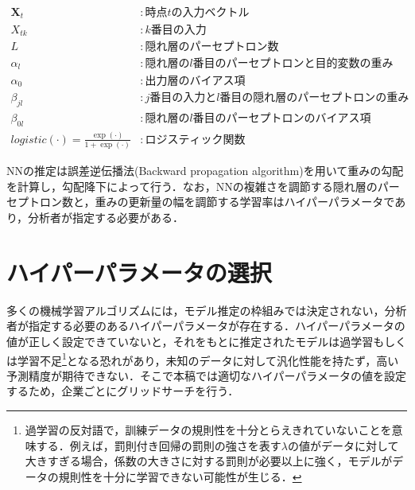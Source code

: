 \documentclass[a4paper，12pt]{jsarticle}
\begin{document}
\begin{equation}
  \begin{split}
    \bm{X}_t &: 時点tの入力ベクトル \\
    X_{tk} &: k番目の入力 \\
    L &: 隠れ層のパーセプトロン数 \\
    \alpha_l &: 隠れ層のl番目のパーセプトロンと目的変数の重み \\
    \alpha_0 &: 出力層のバイアス項 \\
    \beta_{jl} &: j番目の入力とl番目の隠れ層のパーセプトロンの重み \\
    \beta_{0l} &: 隠れ層のl番目のパーセプトロンのバイアス項 \\
    \textit{logistic}(\cdot) = \frac{\exp(\cdot)}{1 + \exp(\cdot)} &: ロジスティック関数
  \end{split}
\end{equation}

NNの推定は誤差逆伝播法(Backward propagation algorithm)を用いて重みの勾配を計算し，勾配降下によって行う．なお，NNの複雑さを調節する隠れ層のパーセプトロン数と，重みの更新量の幅を調節する学習率はハイパーパラメータであり，分析者が指定する必要がある．

\section{ハイパーパラメータの選択} \label{sec:hyparam}

多くの機械学習アルゴリズムには，モデル推定の枠組みでは決定されない，分析者が指定する必要のあるハイパーパラメータが存在する．ハイパーパラメータの値が正しく設定できていないと，それをもとに推定されたモデルは過学習もしくは学習不足\footnote{過学習の反対語で，訓練データの規則性を十分とらえきれていないことを意味する．例えば，罰則付き回帰の罰則の強さを表す$\lambda$の値がデータに対して大きすぎる場合，係数の大きさに対する罰則が必要以上に強く，モデルがデータの規則性を十分に学習できない可能性が生じる．}となる恐れがあり，未知のデータに対して汎化性能を持たず，高い予測精度が期待できない．そこで本稿では適切なハイパーパラメータの値を設定するため，企業ごとにグリッドサーチを行う．
\end{document}
